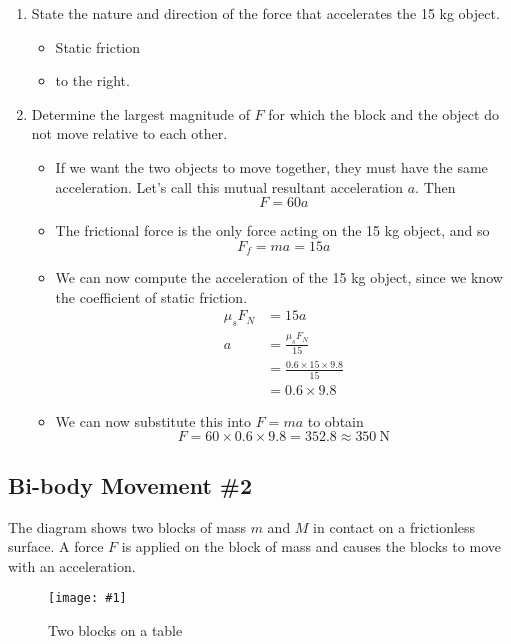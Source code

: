 \documentclass[a4paper,12pt]{article}
\newcommand{\img}[4]{\begin{center}
  \begin{figure}[H]
    \centering
    \texttt{[image: \#1]}
    \caption{#3}
    \label{fig:#4}
  \end{figure}
\end{center}}
\begin{document}
\begin{enumerate}[label=(\alph*)]
  \item State the nature and direction of the force that accelerates the 15 kg object.
        \begin{itemize}
          \item Static friction
          \item to the right.
        \end{itemize}
  \item Determine the largest magnitude of $F$ for which the block and the object do not move relative to each other.
        \begin{itemize}
          \item If we want the two objects to move together, they must have the same acceleration. Let's call this mutual resultant acceleration $a$. Then
                $$F = 60a$$
          \item The frictional force is the only force acting on the 15 kg object, and so
                $$F_f = ma = 15a$$
          \item We can now compute the acceleration of the 15 kg object, since we know the coefficient of static friction.
                \begin{align*}
                  \mu_s F_N & = 15a                                 \\
                  a         & = \frac{\mu_s F_N}{15}                \\
                            & = \frac{0.6 \times 15 \times 9.8}{15} \\
                            & = 0.6\times 9.8
                \end{align*}
          \item We can now substitute this into $F = ma$ to obtain $$F = 60\times 0.6\times 9.8 = 352.8 \approx \SI{350}{\newton}$$
        \end{itemize}
\end{enumerate}

\subsection{Bi-body Movement \#2}

The diagram shows two blocks of mass $m$ and $M$ in contact on a frictionless surface. A force $F$ is applied on the block of mass and causes the blocks to move with an acceleration.

\img{ex/10.png}{0.8}{Two blocks on a table}{twoblocks}
\end{document}
